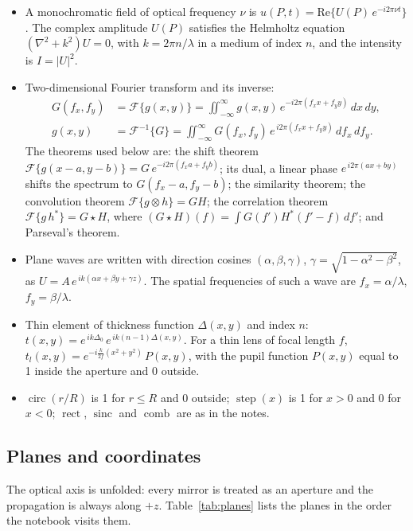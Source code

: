 \documentclass[11pt,a4paper]{article}
\newcommand{\FT}{\mathcal{F}}
\newcommand{\ee}{e}
\newcommand{\dd}{d}
\newcommand{\rect}{\operatorname{rect}}
\newcommand{\sinc}{\operatorname{sinc}}
\newcommand{\step}{\operatorname{step}}
\newcommand{\comb}{\operatorname{comb}}
\newcommand{\circf}{\operatorname{circ}}
\begin{document}
\begin{itemize}[leftmargin=*]
  \item A monochromatic field of optical frequency $\nu$ is
        $u(P,t) = \mathrm{Re}\{U(P)\,\ee^{-i2\pi\nu t}\}$. The complex amplitude
        $U(P)$ satisfies the Helmholtz equation $(\nabla^2 + k^2)U = 0$, with
        $k = 2\pi n/\lambda$ in a medium of index $n$, and the intensity is
        $I = |U|^2$.
  \item Two-dimensional Fourier transform and its inverse:
  \begin{align}
    G(f_x,f_y) &= \FT\{g(x,y)\} = \iint_{-\infty}^{\infty} g(x,y)\,
       \ee^{-i2\pi(f_xx + f_yy)}\,\dd x\,\dd y,
       \label{eq:FT}\\
    g(x,y) &= \FT^{-1}\{G\} = \iint_{-\infty}^{\infty} G(f_x,f_y)\,\ee^{\,i2\pi(f_xx+f_yy)}\,\dd f_x\,\dd f_y .
  \end{align}
  The theorems used below are: the shift theorem
  $\FT\{g(x-a,y-b)\} = G\,\ee^{-i2\pi(f_xa+f_yb)}$; its dual, a linear phase
  $\ee^{\,i2\pi(ax+by)}$ shifts the spectrum to $G(f_x-a,f_y-b)$; the
  similarity theorem; the convolution theorem $\FT\{g\otimes h\} = GH$; the
  correlation theorem $\FT\{g\,h^*\} = G\star H$, where
  $(G\star H)(f) = \int G(f')H^*(f'-f)\,\dd f'$; and Parseval's theorem.
  \item Plane waves are written with direction cosines $(\alpha,\beta,\gamma)$,
        $\gamma = \sqrt{1-\alpha^2-\beta^2}$, as
        $U = A\,\ee^{\,ik(\alpha x + \beta y + \gamma z)}$. The spatial
        frequencies of such a wave are $f_x = \alpha/\lambda$,
        $f_y = \beta/\lambda$.
  \item Thin element of thickness function $\Delta(x,y)$ and index $n$:
        $t(x,y) = \ee^{\,ik\Delta_0}\,\ee^{\,ik(n-1)\Delta(x,y)}$. For a thin
        lens of focal length $f$,
        $t_l(x,y) = \ee^{-i\frac{k}{2f}(x^2+y^2)}\,P(x,y)$, with the pupil
        function $P(x,y)$ equal to 1 inside the aperture and 0 outside.
  \item $\circf(r/R)$ is 1 for $r \le R$ and 0 outside; $\step(x)$ is 1 for
        $x>0$ and 0 for $x<0$; $\rect$, $\sinc$ and $\comb$ are as in the notes.
\end{itemize}

\subsection{Planes and coordinates}

The optical axis is unfolded: every mirror is treated as an aperture and the
propagation is always along $+z$. Table~\ref{tab:planes} lists the planes in
the order the notebook visits them.
\end{document}
